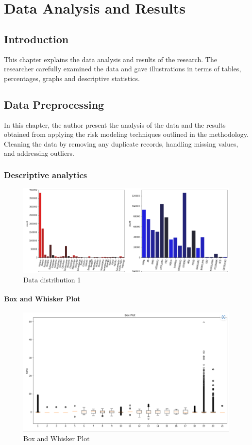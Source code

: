 \chapter{Data Analysis and Results}

\section{Introduction}
This chapter explains the data analysis and results of the research. The researcher
carefully examined the data and gave illustrations in terms of tables, percentages,
graphs and descriptive statistics.

\section{Data Preprocessing}
In this chapter, the author present the analysis of the data and the results obtained from applying the risk modeling 
techniques outlined in the methodology. Cleaning the data by removing any duplicate records, handling missing 
values, and addressing outliers.

\subsection{Descriptive analytics}
\begin{figure}[h]
    \centering
    \includegraphics[width=1\linewidth]{image1}
    \caption{Data distribution 1}
    \label{fig:example}
\end{figure}
\newpage
\subsubsection{Box and Whisker Plot}
\begin{figure}[h]
    \centering
    \includegraphics[width=1\linewidth]{image7}
    \caption{Box and Whisker Plot}
    \label{fig:example}
\end{figure}

